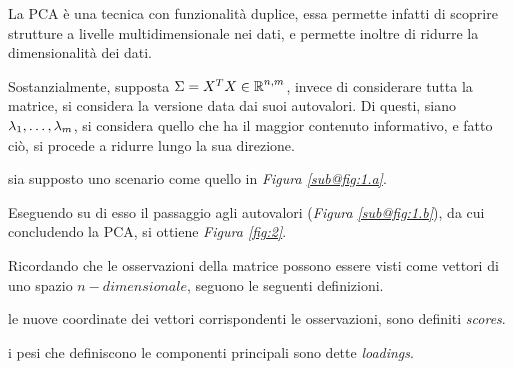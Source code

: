 \documentclass{subfiles}
\begin{document}
La PCA è una tecnica con funzionalità duplice, essa permette infatti di scoprire strutture a livelle multidimensionale nei dati,
e permette inoltre di ridurre la dimensionalità dei dati.

Sostanzialmente, supposta $\Sigma = X^{T}X \in \operatorname{\mathbb{R}}^{n, m}$, invece di considerare tutta la matrice,
si considera la versione data dai suoi autovalori. Di questi, siano ${\lambda}_{1}, \ldots, {\lambda}_{m}$, si considera quello che ha il maggior contenuto informativo,
e fatto ciò, si procede a ridurre lungo la sua direzione.

\begin{Example*}
    sia supposto uno scenario come quello in \emph{Figura \ref{sub@fig:1.a}}.
    
    Eseguendo su di esso il passaggio agli autovalori (\emph{Figura \ref{sub@fig:1.b}}),
    da cui concludendo la PCA, si ottiene \emph{Figura \ref{fig:2}}.
    
\end{Example*}

Ricordando che le osservazioni della matrice possono essere visti come vettori di uno spazio $n-dimensionale$, seguono le seguenti definizioni.
\begin{Definition*}
    le nuove coordinate dei vettori corrispondenti le osservazioni, sono definiti \emph{scores}.
\end{Definition*}
\begin{Definition*}
    i pesi che definiscono le componenti principali sono dette \emph{loadings}.
\end{Definition*}
\end{document}
